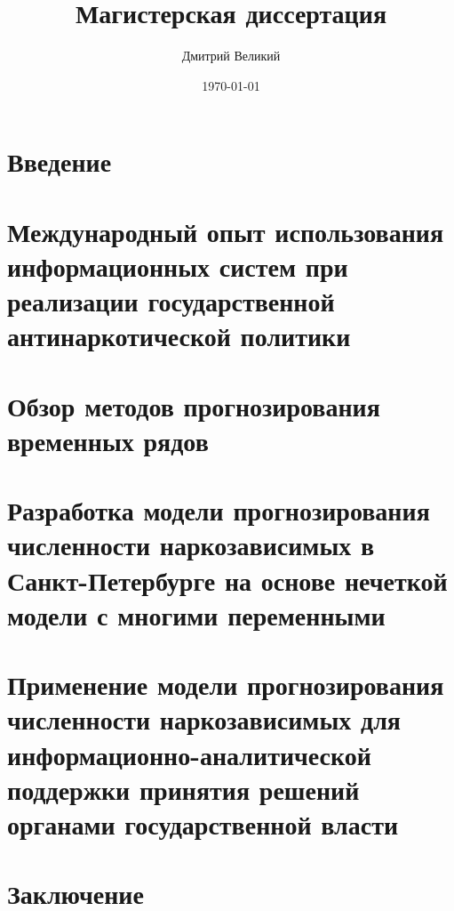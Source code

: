 \documentclass[a4paper,14pt]{report}
\author{Дмитрий Великий}
\title{Магистерская диссертация}
\date{\today}
\begin{document}

\tableofcontents
\chapter*{Введение}

\chapter{Международный опыт использования информационных систем при реализации
    государственной антинаркотической политики}

\chapter{Обзор методов прогнозирования временных рядов}

\chapter{Разработка модели прогнозирования численности наркозависимых в 
Санкт-Петербурге на основе нечеткой модели с многими переменными}

\chapter{Применение модели прогнозирования численности наркозависимых для
    информационно-аналитической поддержки принятия решений органами
    государственной власти}

\chapter*{Заключение}

\newpage
\printbibliography[heading=bibintoc]
\end{document}

